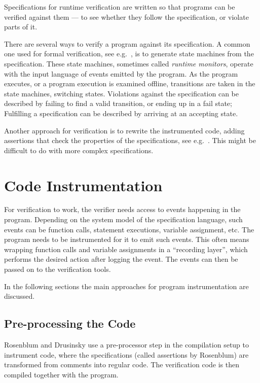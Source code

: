 Specifications for runtime verification are written so that programs can be
verified against them --- to see whether they follow the specification, or
violate parts of it.

There are several ways to verify a program against its specification. A common
one used for formal verification, see e.g.\ \cite{bauer06monitoring,
bodden05efficientrv, jalili07rverl, barringer03eagle}, is to generate state
machines from the specification. These state machines, sometimes called
\textit{runtime monitors}, operate with the input language of events emitted by
the program. As the program executes, or a program execution is examined
offline, transitions are taken in the state machines, switching states.
Violations against the specification can be described by failing to find a
valid transition, or ending up in a fail state; Fulfilling a specification can
be described by arriving at an accepting state.

Another approach for verification is to rewrite the instrumented code, adding
assertions that check the properties of the specifications, see e.g.\
\cite{rosenblum95practicalassertions, drusinsky00temporalrover}. This might be
difficult to do with more complex specifications.


\section{Code Instrumentation} \label{section-instrumentation}

For verification to work, the verifier needs access to events happening in the
program. Depending on the system model of the specification language, such
events can be function calls, statement executions, variable assignment, etc.
The program needs to be instrumented for it to emit such events. This often
means wrapping function calls and variable assignments in a ``recording
layer'', which performs the desired action after logging the event. The events
can then be passed on to the verification tools.

In the following sections the main approaches for program instrumentation are
discussed.


\subsection{Pre-processing the Code}

Rosenblum \cite{rosenblum95practicalassertions} and Drusinsky
\cite{drusinsky00temporalrover} use a pre-processor step in the compilation
setup to instrument code, where the specifications (called assertions by
Rosenblum) are transformed from comments into regular code. The verification
code is then compiled together with the program.

